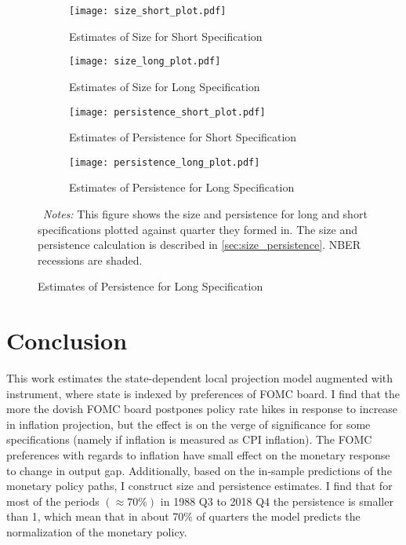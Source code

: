 \documentclass[11pt]{article}
\begin{document}
\begin{figure}[!hptb]\centering
  \caption{Size and Persistence Dynamics}
  \label{fig:size_persistence_plot}
  \vspace{1ex}
  \begin{minipage}{0.92\textwidth}
    \begin{subfigure}[b]{0.494\textwidth}\centering
      \caption{Estimates of Size for Short Specification}
    \texttt{[image: size\_short\_plot.pdf]}
    \end{subfigure}\hfill   \begin{subfigure}[b]{0.494\textwidth}\centering
      \caption{Estimates of Size for Long Specification}
    \texttt{[image: size\_long\_plot.pdf]}
    \end{subfigure}
    \vspace{1ex}
    \begin{subfigure}[b]{0.494\textwidth}\centering
      \caption{Estimates of Persistence for Short Specification}
    \texttt{[image: persistence\_short\_plot.pdf]}
    \end{subfigure}\hfill
    \begin{subfigure}[b]{0.494\textwidth}\centering      \caption{Estimates of Persistence for Long Specification}
    \texttt{[image: persistence\_long\_plot.pdf]}
    \end{subfigure}
    \begin{flushleft}\scriptsize
    ~\textit{Notes:} This figure shows the size and persistence for long and short specifications plotted against quarter they formed in. The size and persistence calculation is described in \vref{sec:size_persistence}. 
    NBER recessions are shaded.
    \end{flushleft}
  \end{minipage}  
\end{figure}

\section{Conclusion}

This work estimates the state-dependent local projection model augmented with instrument, where state is indexed by preferences of FOMC board. 
I find that the more the dovish FOMC board postpones policy rate hikes in response to increase in inflation projection, but the effect is on the verge of significance for some specifications (namely if inflation is measured as CPI inflation).
The FOMC preferences with regards to inflation have small effect on the monetary response to change in output gap.
Additionally, based on the in-sample predictions of the monetary policy paths, I construct size and persistence estimates. 
I find that for most of the periods $(\approx 70\%)$ in 1988 Q3 to 2018 Q4 the persistence is smaller than 1, which mean that in about 70\% of quarters the model predicts the normalization of the monetary policy.
\end{document}

